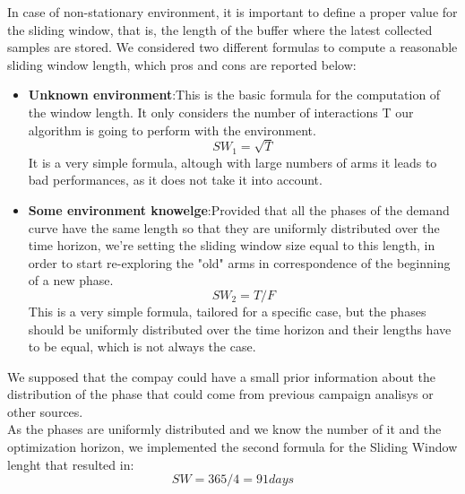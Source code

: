 In case of non-stationary environment, it is important to define a
proper value for the sliding window, that is, the length of the buffer where the latest
collected samples are stored. We considered two different formulas to compute a
reasonable sliding window length, which pros and cons are reported below:

\begin{itemize}
	\item \textbf{Unknown environment}:\@  This is the basic formula for the computation of the window length. It only considers the number of interactions T our algorithm is going to perform
	with the environment.
	$$SW_1 = \sqrt{T}$$
	It is a very simple formula, altough with large numbers of arms it leads to bad performances, as it does not take it into account.
	
	\item \textbf{Some environment knowelge}:\@  Provided that all the phases of the demand curve have the same length so that they are uniformly distributed over the time horizon, we’re setting the sliding window size equal to this length, in
	order to start re-exploring the "old" arms in correspondence of the beginning
	of a new phase.
	$$SW_2 = T/F$$
	This is a very simple formula, tailored for a specific case, but the phases should be uniformly distributed over the time horizon
	and their lengths have to be equal, which is not always the case.	
\end{itemize} 

We supposed that the compay could have a small prior information about the distribution of the phase that could come from previous campaign analisys or other sources.
\\As the phases are uniformly distributed and we know the number of it and the optimization horizon, we implemented the second formula for the Sliding Window lenght that resulted in:
$$SW = 365/4 = 91 days$$